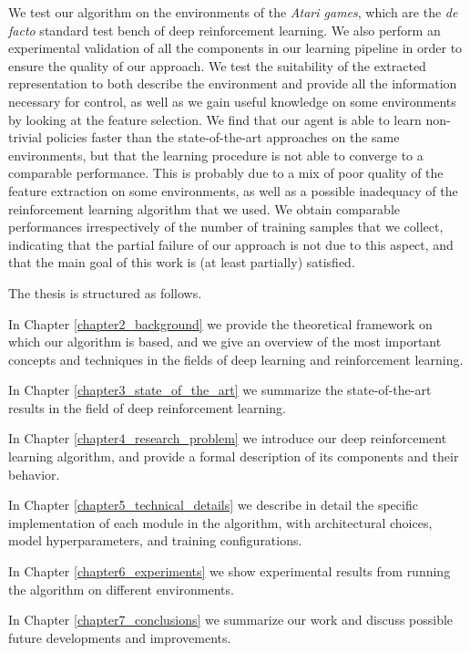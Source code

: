We test our algorithm on the environments of the \textit{Atari games}, which are
the \textit{de facto} standard test bench of deep reinforcement learning. We 
also perform an experimental validation of all the components in our learning 
pipeline in order to ensure the quality of our approach.
We test the suitability of the extracted representation to both describe the 
environment and provide all the information necessary for control, as well as 
we gain useful knowledge on some environments by looking at the feature 
selection.
We find that our agent is able to learn non-trivial policies faster than the
state-of-the-art approaches on the same environments, but that the learning 
procedure is not able to converge to a comparable performance. 
This is probably due to a mix of poor quality of the feature extraction on some 
environments, as well as a possible inadequacy of the reinforcement learning 
algorithm that we used. We obtain comparable performances irrespectively of
the number of training samples that we collect, indicating that the partial
failure of our approach is not due to this aspect, and that the main goal of 
this work is (at least partially) satisfied.

The thesis is structured as follows. 

In Chapter \ref{chapter2_background} we provide the theoretical framework on
which our algorithm is based, and we give an overview of the most important 
concepts and techniques in the fields of deep learning and reinforcement 
learning.

In Chapter \ref{chapter3_state_of_the_art} we summarize the state-of-the-art 
results in the field of deep reinforcement learning.

In Chapter \ref{chapter4_research_problem} we introduce our deep reinforcement 
learning algorithm, and provide a formal description of its components and 
their behavior.

In Chapter \ref{chapter5_technical_details} we describe in detail the specific 
implementation of each module in the algorithm, with architectural choices, 
model hyperparameters, and training configurations.

In Chapter \ref{chapter6_experiments} we show experimental results from running
the algorithm on different environments.

In Chapter \ref{chapter7_conclusions} we summarize our work and discuss possible
future developments and improvements.


